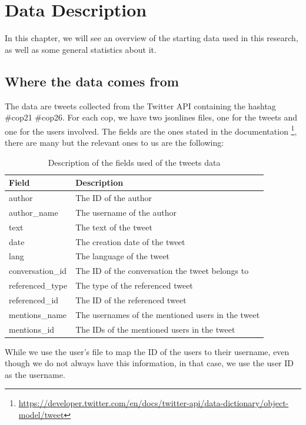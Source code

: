 
\chapter{Data Description}%
In this chapter, we will see an overview of the starting data used in this research, as well as some general statistics about it.

\section{Where the data comes from}
The data are tweets collected from the Twitter API containing the hashtag \#cop21 \#cop26. 
For each cop, we have two jsonlines files, one for the tweets and one for the users involved. The fields are the ones stated in the documentation \footnote{ \href{https://developer.twitter.com/en/docs/twitter-api/data-dictionary/object-model/tweet}{https://developer.twitter.com/en/docs/twitter-api/data-dictionary/object-model/tweet}}, there are many but the relevant ones to us are the following: 

\begin{table}[H]
\centering
\begin{tabular}{|l|l|}
\hline
\textbf{Field} & \textbf{Description} \\ \hline
author & The ID of the author \\ \hline
author\_name & The username of the author \\ \hline
text & The text of the tweet \\ \hline
date & The creation date of the tweet \\ \hline
lang & The language of the tweet \\ \hline
conversation\_id & The ID of the conversation the tweet belongs to \\ \hline
referenced\_type & The type of the referenced tweet \\ \hline
referenced\_id & The ID of the referenced tweet \\ \hline
mentions\_name & The usernames of the mentioned users in the tweet \\ \hline
mentions\_id & The IDs of the mentioned users in the tweet \\ \hline

\end{tabular}
\caption{Description of the fields used of the tweets data}
\label{tab:my_label}
\end{table}
While we use the user's file to map the ID of the users to their username, even though we do not always have this information, in that case, we use the user ID as the username.

